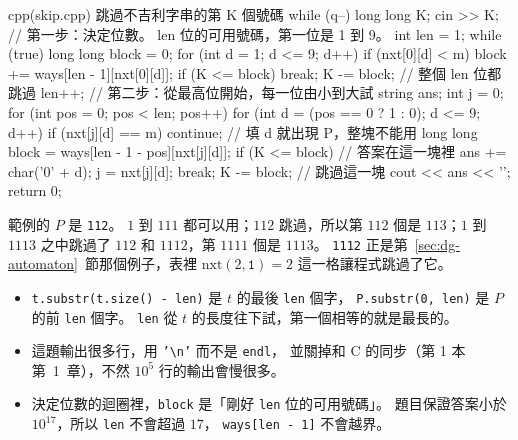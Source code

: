 \begin{example}[label=ex:dg-skip]{cpp}{(skip.cpp) 跳過不吉利字串的第 K 個號碼}
{    while (q--) {
        long long K;
        cin >> K;
        // 第一步：決定位數。 len 位的可用號碼，第一位是 1 到 9。
        int len = 1;
        while (true) {
            long long block = 0;
            for (int d = 1; d <= 9; d++) {
                if (nxt[0][d] < m) {
                    block += ways[len - 1][nxt[0][d]];
                }
            }
            if (K <= block) {
                break;
            }
            K -= block;                // 整個 len 位都跳過
            len++;
        }
        // 第二步：從最高位開始，每一位由小到大試
        string ans;
        int j = 0;
        for (int pos = 0; pos < len; pos++) {
            for (int d = (pos == 0 ? 1 : 0); d <= 9; d++) {
                if (nxt[j][d] == m) {
                    continue;          // 填 d 就出現 P，整塊不能用
                }
                long long block = ways[len - 1 - pos][nxt[j][d]];
                if (K <= block) {      // 答案在這一塊裡
                    ans += char('0' + d);
                    j = nxt[j][d];
                    break;
                }
                K -= block;            // 跳過這一塊
            }
        }
        cout << ans << '\n';
    }
    return 0;
}
\end{example}


範例的 $P$ 是 \texttt{112}。 $1$ 到 $111$ 都可以用；$112$ 跳過，所以第 $112$
個是 $113$；$1$ 到 $1113$ 之中跳過了 $112$ 和 $1112$，第 $1111$ 個是 $1113$。
\texttt{1112} 正是第~\ref{sec:dg-automaton}~節那個例子，表裡 $\mathrm{nxt}(2,
\texttt{1}) = 2$ 這一格讓程式跳過了它。

\begin{itemize}
\item \texttt{t.substr(t.size() - len)} 是 $t$ 的最後 \texttt{len} 個字，
\texttt{P.substr(0, len)} 是 $P$ 的前 \texttt{len} 個字。 \texttt{len} 從
$t$ 的長度往下試，第一個相等的就是最長的。
\item 這題輸出很多行，用 \texttt{'\textbackslash n'} 而不是 \texttt{endl}，
並關掉和 C 的同步（第 1 本第~1~章），不然 $10^5$ 行的輸出會慢很多。
\item 決定位數的迴圈裡，\texttt{block} 是「剛好 \texttt{len} 位的可用號碼」。
題目保證答案小於 $10^{17}$，所以 \texttt{len} 不會超過 $17$，
\texttt{ways[len - 1]} 不會越界。
\end{itemize}

